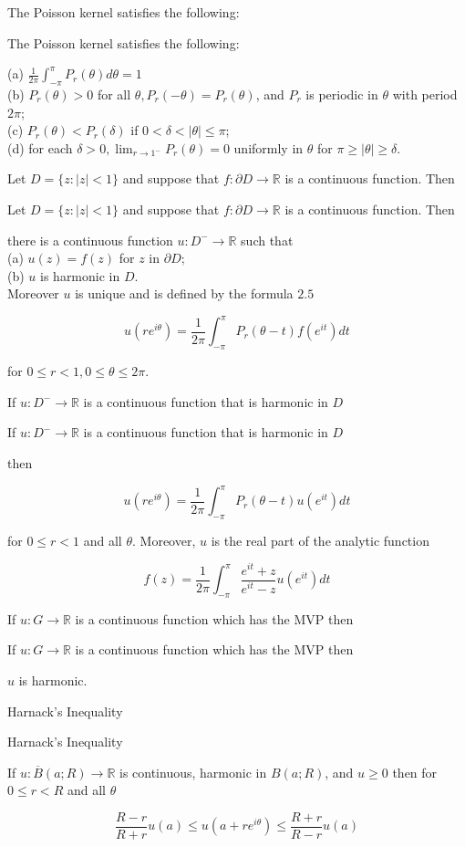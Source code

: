 \documentclass[17pt]{extarticle}
\renewcommand{\bar}[1]{\overline{#1}}
\newcommand{\boxset}[2]{\begin{mdframed}[style=darkQuesion]
#1
\end{mdframed}
\newpage
\begin{mdframed}[style=darkQuesion]
#1
  \end{mdframed}
\begin{mdframed}[style=darkAnswer]
#2
  \end{mdframed}
  \newpage
}
\begin{document}
\boxset{The Poisson kernel satisfies the following:}
{
(a) $\frac{1}{2 \pi} \int_{-\pi}^{\pi} P_{r}(\theta) d \theta=1$\[\ \]
(b) $P_{r}(\theta)>0$ for all $\theta, P_{r}(-\theta)=P_{r}(\theta)$, and $P_{r}$ is periodic in $\theta$ with period $2 \pi$;\[\ \]
(c) $P_{r}(\theta)<P_{r}(\delta)$ if $0<\delta<|\theta| \leq \pi$;\[\ \]
(d) for each $\delta>0, \lim _{r \rightarrow 1^{-}} P_{r}(\theta)=0$ uniformly in $\theta$ for $\pi \geq|\theta| \geq \delta$.
}
\boxset{Let $D=\{z:|z|<1\}$ and suppose that $f: \partial D \rightarrow \mathbb{R}$ is a continuous function. Then}
{there is a continuous function $u: D^{-} \rightarrow \mathbb{R}$ such that\[\ \]
(a) $u(z)=f(z)$ for $z$ in $\partial D$;\[\ \]
(b) $u$ is harmonic in $D$.\[\ \]
Moreover $u$ is unique and is defined by the formula $2.5$

\[
u\left(r e^{i \theta}\right)=\frac{1}{2 \pi} \int_{-\pi}^{\pi} P_{r}(\theta-t) f\left(e^{i t}\right) d t
\]

for $0 \leq r<1,0 \leq \theta \leq 2 \pi$.
}

\boxset{If $u: D^{-} \rightarrow \mathbb{R}$ is a continuous function that is harmonic in $D$}
{
then

\[
u\left(r e^{i \theta}\right)=\frac{1}{2 \pi} \int_{-\pi}^{\pi} P_{r}(\theta-t) u\left(e^{i t}\right) d t
\]

for $0 \leq r<1$ and all $\theta$. Moreover, $u$ is the real part of the analytic function

\[
f(z)=\frac{1}{2 \pi} \int_{-\pi}^{\pi} \frac{e^{i t}+z}{e^{i t}-z} u\left(e^{i t}\right) d t
\]

}

\boxset{If $u: G \rightarrow \mathbb{R}$ is a continuous function which has the MVP then}
{$u$ is harmonic.}

\boxset{Harnack's Inequality}
{If $u: \bar{B}(a ; R) \rightarrow \mathbb{R}$ is continuous, harmonic in $B(a ; R)$, and $u \geq 0$ then for $0 \leq r<R$ and all $\theta$

\[
\frac{R-r}{R+r} u(a) \leq u\left(a+r e^{i \theta}\right) \leq \frac{R+r}{R-r} u(a)
\]

}
\end{document}
